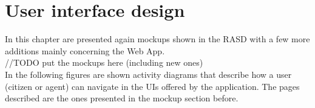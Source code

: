 \documentclass[a4paper]{report}
\begin{document}
\chapter{User interface design}
In this chapter are presented again mockups shown in the RASD with a few more additions  mainly concerning the Web App. \\
//TODO put the mockups here (including new ones) \\
In the following figures are shown activity diagrams that describe how a user (citizen or agent) can navigate in the UIs offered by the application. The pages described are the ones presented in the mockup section before.
\end{document}
